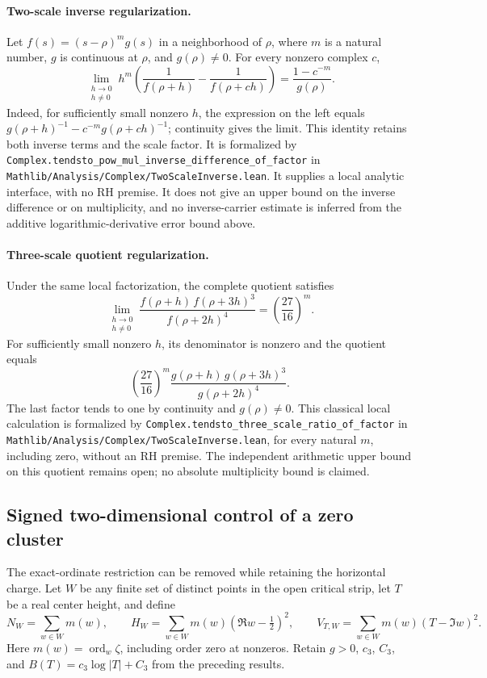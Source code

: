 \paragraph{Two-scale inverse regularization.}
Let \(f(s)=(s-\rho)^m g(s)\) in a neighborhood of \(\rho\), where
\(m\) is a natural number, \(g\) is continuous at \(\rho\), and
\(g(\rho)\ne0\). For every nonzero complex \(c\),
\[
 \lim_{\substack{h\to0\\h\ne0}}
 h^m\left(\frac1{f(\rho+h)}-\frac1{f(\rho+ch)}\right)
 =\frac{1-c^{-m}}{g(\rho)}.
\]
Indeed, for sufficiently small nonzero \(h\), the expression on the
left equals
\(g(\rho+h)^{-1}-c^{-m}g(\rho+ch)^{-1}\); continuity gives the limit.
This identity retains both inverse terms and the scale factor.
It is formalized by
\texttt{Complex.tendsto\_pow\_mul\_inverse\_difference\_of\_factor} in
\texttt{Mathlib/Analysis/Complex/TwoScaleInverse.lean}.
It supplies a local analytic interface, with no RH premise.
It does not give an upper bound on the inverse difference or on
multiplicity, and no inverse-carrier estimate is inferred from the
additive logarithmic-derivative error bound above.

\paragraph{Three-scale quotient regularization.}
Under the same local factorization, the complete quotient satisfies
\[
 \lim_{\substack{h\to0\\h\ne0}}
 \frac{f(\rho+h)\,f(\rho+3h)^3}{f(\rho+2h)^4}
 =\left(\frac{27}{16}\right)^m.
\]
For sufficiently small nonzero \(h\), its denominator is nonzero and
the quotient equals
\[
 \left(\frac{27}{16}\right)^m
 \frac{g(\rho+h)\,g(\rho+3h)^3}{g(\rho+2h)^4}.
\]
The last factor tends to one by continuity and \(g(\rho)\ne0\).
This classical local calculation is formalized by
\texttt{Complex.tendsto\_three\_scale\_ratio\_of\_factor} in
\texttt{Mathlib/Analysis/Complex/TwoScaleInverse.lean}, for every
natural \(m\), including zero, without an RH premise.
The independent arithmetic upper bound on this quotient remains open;
no absolute multiplicity bound is claimed.

\subsection{Signed two-dimensional control of a zero cluster}
\label{sec:cluster-multiplicity}

The exact-ordinate restriction can be removed while retaining the horizontal
charge.  Let \(W\) be any finite set of distinct points in the open critical
strip, let \(T\) be a real center height, and define
\[
 N_W=\sum_{w\in W}m(w),\qquad
 H_W=\sum_{w\in W}m(w)(\Re w-\tfrac12)^2,\qquad
 V_{T,W}=\sum_{w\in W}m(w)(T-\Im w)^2.
\]
Here \(m(w)=\operatorname{ord}_w\zeta\), including order zero at nonzeros.
Retain \(g>0\), \(c_3\), \(C_3\), and
\(B(T)=c_3\log|T|+C_3\) from the preceding results.

